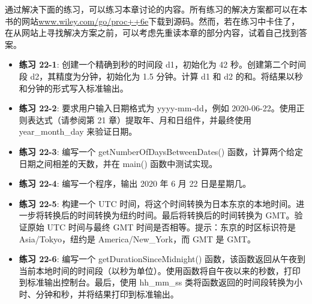 通过解决下面的练习，可以练习本章讨论的内容。所有练习的解决方案都可以在本书的网站\url{www.wiley.com/go/proc++6e}下载到源码。然而，若在练习中卡住了，在从网站上寻找解决方案之前，可以考虑先重读本章的部分内容，试着自己找到答案。

\begin{itemize}
\item
\textbf{练习 22-1}: 创建一个精确到秒的时间段 d1，初始化为 42 秒。创建第二个时间段 d2，其精度为分钟，初始化为 1.5 分钟。计算 d1 和 d2 的和。将结果以秒和分钟的形式写入标准输出。

\item
\textbf{练习 22-2}: 要求用户输入日期格式为 yyyy-mm-dd，例如 2020-06-22。使用正则表达式（请参阅第 21 章）提取年、月和日组件，并最终使用 year\_month\_day 来验证日期。

\item
\textbf{练习 22-3}: 编写一个 getNumberOfDaysBetweenDates() 函数，计算两个给定日期之间相差的天数，并在 main() 函数中测试实现。

\item
\textbf{练习 22-4}: 编写一个程序，输出 2020 年 6 月 22 日是星期几。

\item
\textbf{练习 22-5}: 构建一个 UTC 时间，将这个时间转换为日本东京的本地时间。进一步将转换后的时间转换为纽约时间。最后将转换后的时间转换为 GMT。验证原始 UTC 时间与最终 GMT 时间是否相等。提示：东京的时区标识符是 Asia/Tokyo，纽约是 America/New\_York，而 GMT 是 GMT。

\item
\textbf{练习 22-6}: 编写一个 getDurationSinceMidnight() 函数，该函数返回从午夜到当前本地时间的时间段（以秒为单位）。使用函数将自午夜以来的秒数，打印到标准输出控制台。最后，使用 hh\_mm\_ss 类将函数返回的时间段转换为小时、分钟和秒，并将结果打印到标准输出。
\end{itemize}











